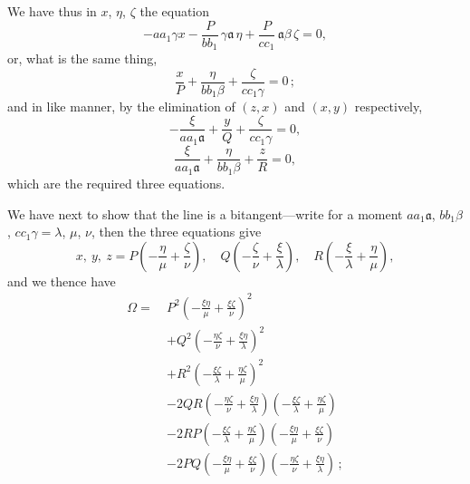 \documentclass[11pt,a4paper]{article}
\begin{document}
\medskip
We have thus in $x$, $\eta$, $\zeta$ the equation
\[
-aa_{1}\gamma x - \frac{P}{bb_{1}}\,\gamma\mathfrak{a}\,\eta + \frac{P}{cc_{1}}\,\mathfrak{a}\beta\,\zeta = 0,
\]
or, what is the same thing,
\[
\frac{x}{P} + \frac{\eta}{bb_{1}\beta} + \frac{\zeta}{cc_{1}\gamma} = 0\,;
\]
and in like manner, by the elimination of $(z, x)$ and $(x, y)$ respectively,
\[
-\frac{\xi}{aa_{1}\mathfrak{a}} + \frac{y}{Q} + \frac{\zeta}{cc_{1}\gamma} = 0,
\]
\[
\frac{\xi}{aa_{1}\mathfrak{a}} + \frac{\eta}{bb_{1}\beta} + \frac{z}{R} = 0,
\]
which are the required three equations.

\medskip
We have next to show that the line is a bitangent---write for a moment $aa_{1}\mathfrak{a}$, $bb_{1}\beta$, $cc_{1}\gamma = \lambda$, $\mu$, $\nu$, then the three equations give
\[
x,\ y,\ z = P\!\left(-\frac{\eta}{\mu} + \frac{\zeta}{\nu}\right),\quad Q\!\left(-\frac{\zeta}{\nu} + \frac{\xi}{\lambda}\right),\quad R\!\left(-\frac{\xi}{\lambda} + \frac{\eta}{\mu}\right),
\]
and we thence have
\[
\begin{aligned}
\Omega = \ &P^{2}\!\left(-\frac{\xi\eta}{\mu} + \frac{\xi\zeta}{\nu}\right)^{2}\\
          &+ Q^{2}\!\left(-\frac{\eta\zeta}{\nu} + \frac{\xi\eta}{\lambda}\right)^{2}\\
          &+ R^{2}\!\left(-\frac{\xi\zeta}{\lambda} + \frac{\eta\zeta}{\mu}\right)^{2}\\
          &- 2QR\!\left(-\frac{\eta\zeta}{\nu} + \frac{\xi\eta}{\lambda}\right)\!\left(-\frac{\xi\zeta}{\lambda} + \frac{\eta\zeta}{\mu}\right)\\
          &- 2RP\!\left(-\frac{\xi\zeta}{\lambda} + \frac{\eta\zeta}{\mu}\right)\!\left(-\frac{\xi\eta}{\mu} + \frac{\xi\zeta}{\nu}\right)\\
          &- 2PQ\!\left(-\frac{\xi\eta}{\mu} + \frac{\xi\zeta}{\nu}\right)\!\left(-\frac{\eta\zeta}{\nu} + \frac{\xi\eta}{\lambda}\right)\,;
\end{aligned}
\]
\clearpage
\end{document}
